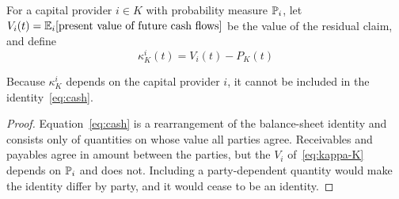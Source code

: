 \begin{definition}
\label{def:kappa-K}
For a capital provider $i\in K$ with probability measure $\mathbb{P}_i$, let
$V_i(t) = \mathbb{E}_i[\text{present value of future cash flows}]$ be the value of the residual
claim, and define
\begin{equation}
\kappa_K^{i}(t) = V_i(t) - P_K(t)
\label{eq:kappa-K}
\end{equation}
\end{definition}

\begin{proposition}
\label{prop:kappa-K-excluded}
Because $\kappa_K^{i}$ depends on the capital provider $i$, it cannot be included in the
identity~\eqref{eq:cash}.
\end{proposition}

\begin{proof}
Equation~\eqref{eq:cash} is a rearrangement of the balance-sheet identity and consists only
of quantities on whose value all parties agree. Receivables and payables agree in amount
between the parties, but the $V_i$ of~\eqref{eq:kappa-K} depends on $\mathbb{P}_i$ and does not.
Including a party-dependent quantity would make the identity differ by party, and it would
cease to be an identity.
\end{proof}

